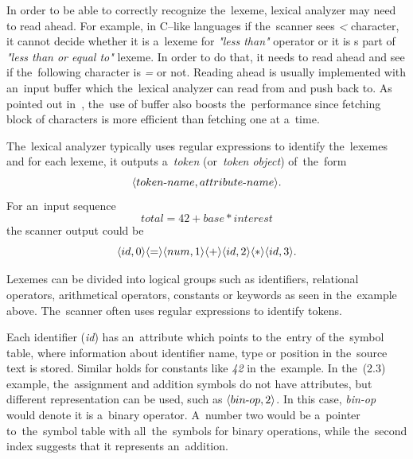 \documentclass[
  digital, %
  table,   %
  lof,     %
  lot,     %
  oneside,
]{fithesis3}
\begin{document}
In order to be able to correctly recognize the~lexeme, lexical analyzer may need to read ahead. For example, in C--like languages if the~scanner sees \textit{<} character, it cannot decide whether it is a~lexeme for \textit{"less than"} operator or it is s part of \textit{"less than or equal to"} lexeme. In order to do that, it needs to read ahead and see if the~following character is \textit{=} or not. Reading ahead is usually implemented with an~input buffer which the~lexical analyzer can read from and push back to. As pointed out in~\cite{dragon-book}, the~use of buffer also boosts the~performance since fetching block of characters is more efficient than fetching one at a~time.

The~lexical analyzer typically uses regular expressions to identify the~lexemes and for each lexeme, it outputs a~\textit{token} (or~\textit{token object}) of~the~form 
\begin{equation}
  \langle token \textnormal{-} name, attribute \textnormal{-} name \rangle \textnormal{.}
\end{equation}
For an~input sequence 
\begin{equation}
  total = 42 + base * interest
\end{equation} 
the scanner output could be
\begin{equation}
  \langle id, 0 \rangle 
  \langle = \rangle 
  \langle num, 1 \rangle 
  \langle + \rangle 
  \langle id, 2 \rangle 
  \langle * \rangle 
  \langle id, 3 \rangle
\textnormal{.}
\end{equation}

Lexemes can be divided into logical groups such as identifiers, relational operators, arithmetical operators, constants or keywords as seen in the~example above. The~scanner often uses regular expressions to identify tokens.

Each identifier (\textit{id}) has an~attribute which points to the~entry of the~symbol table, where information about identifier name, type or position in the~source text is stored. Similar holds for constants like \textit{42} in the~example. In the~(2.3) example, the~assignment and addition symbols do not have attributes, but different representation can be used, such as $ \langle bin \textnormal{-} op, 2 \rangle $. In this case, \textit{bin-op} would denote it is a~binary operator. A~number two would be a~pointer to~the~symbol table with all~the~symbols for binary operations, while the~second index suggests that it represents an~addition.
\end{document}
